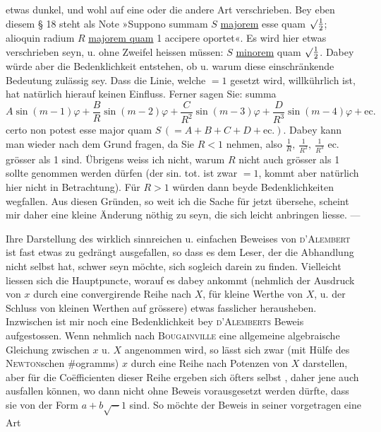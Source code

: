 etwas dunkel, und wohl auf eine oder die andere Art verschrieben. Bey eben diesem § 18 steht
als Note »Suppono summam $S$ \underline{majorem} esse quam $\surd\frac12$; alioquin radium $R$
\underline{majorem quam} 1 accipere oportet«. Es wird hier etwas verschrieben seyn, u. ohne
Zweifel heissen müssen: $S$ \underline{minorem} quam $\surd\frac12$. Dabey würde aber die
Bedenklichkeit entstehen, ob u. warum diese einschränkende Bedeutung zulässig sey. Dass die
Linie, welche $=1$ gesetzt wird, willkührlich ist, hat natürlich hierauf keinen Einfluss.
Ferner sagen Sie: summa
\[
A\sin(m-1)\varphi+\frac BR\sin(m-2)\varphi+\frac C{R^2}\sin(m-3)\varphi
+\frac D{R^3}\sin(m-4)\varphi+\mathrm{ec.}
\]
\noindent certo non potest esse major quam $S\,(=A+B+C+D+\mathrm{ec.})$.
Dabey kann man wieder nach dem Grund fragen, da Sie $R<1$ nehmen, also
$\frac1R,\ \frac1{R^2},\ \frac1{R^3}$ ec. grösser als 1 sind.
Übrigens weiss ich nicht, warum $R$ nicht auch grösser als 1 sollte genommen werden dürfen
(der sin. tot. ist zwar $=1$, kommt aber natürlich hier nicht in Betrachtung).
Für $R>1$ würden dann beyde Bedenklichkeiten wegfallen. Aus diesen Gründen, so weit ich die
Sache für jetzt übersehe, scheint mir daher eine kleine Änderung nöthig zu seyn, die sich leicht
anbringen liesse. —
\par\clearpage
{}
\noindent\hspace*{\parindent}Ihre Darstellung des wirklich sinnreichen u. einfachen Beweises von
\textsc{d’Alembert} ist fast etwas zu gedrängt ausgefallen, so dass es dem Leser, der die
Abhandlung nicht selbst hat, schwer seyn möchte, sich sogleich darein zu finden. Vielleicht
liessen sich die Hauptpuncte, worauf es dabey ankommt (nehmlich der Ausdruck von $x$ durch
eine convergirende Reihe nach $X$, für kleine Werthe von $X$, u. der Schluss von kleinen
Werthen auf grössere) etwas fasslicher herausheben. Inzwischen ist mir noch eine Bedenklichkeit
bey \textsc{d’Alemberts} Beweis aufgestossen. Wenn nehmlich nach \textsc{Bougainville} eine
allgemeine algebraische Gleichung zwischen $x$ u. $X$ angenommen wird, so lässt sich zwar
(mit Hülfe des \textsc{Newton}schen \#ogramms) $x$ durch eine Reihe nach Potenzen von $X$
darstellen, aber für die Coëfficienten dieser Reihe ergeben sich öfters selbst
, daher jene auch  ausfallen können,
wo dann nicht ohne Beweis vorausgesetzt werden dürfte, dass sie von der Form $a+b\surd-1$
sind. So möchte der Beweis in seiner  vorgetragen eine Art
